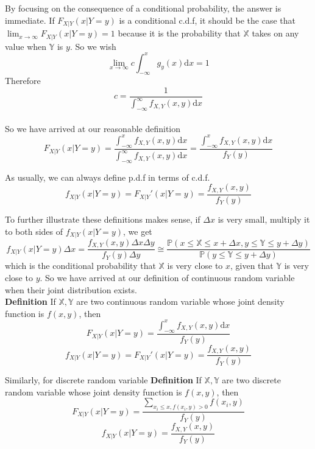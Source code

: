 \documentclass[a4paper,12pt]{article}
\begin{document}
By focusing on the consequence of a conditional probability, the answer is immediate. If $F_{X|Y}(x|Y=y)$ is a conditional c.d.f, it should be the case that $\lim_{x\to\infty}F_{X|Y}(x|Y=y) = 1$ because it is the probability that $\mathbb{X}$ takes on any value when $\mathbb{Y}$ is $y$. So we wish
$$\lim_{x\to\infty} c\int_{-\infty}^x g_y(x) \mathrm{d}x = 1$$
Therefore
$$c = \frac{1}{\int_{-\infty}^\infty f_{X,Y}(x, y)\mathrm{d}x}$$\\
So we have arrived at our reasonable definition
$$F_{X|Y}(x|Y=y) = \frac{\int_{-\infty}^x f_{X,Y}(x, y) \mathrm{d}x}{\int_{-\infty}^\infty f_{X,Y}(x, y)\mathrm{d}x} = \frac{\int_{-\infty}^x f_{X,Y}(x, y) \mathrm{d}x}{f_Y(y)}$$

As usually, we can always define p.d.f in terms of c.d.f. 
$$f_{X|Y}(x|Y=y) = F_{X|Y}'(x|Y=y) = \frac{f_{X,Y}(x, y)}{f_Y(y)}$$

To further illustrate these definitions makes sense, if $\Delta x$ is very small, multiply it to both sides of $f_{X|Y}(x|Y=y)$, we get
$$f_{X|Y}(x|Y=y)\Delta x = \frac{f_{X,Y}(x, y)\Delta x\Delta y}{f_Y(y)\Delta y} \cong \frac{\mathbb{P}(x \leq \mathbb{X} \leq x + \Delta x, y \leq \mathbb{Y} \leq y + \Delta y)}{\mathbb{P}( y \leq \mathbb{Y} \leq y + \Delta y )}$$ 
which is the conditional probability that $\mathbb{X}$ is very close to $x$, given that $\mathbb{Y}$ is very close to $y$. So we have arrived at our definition of continuous random variable when their joint distribution exists.\\

\textbf{Definition} If $\mathbb{X}, \mathbb{Y}$ are two continuous random variable whose joint density function is $f(x,y)$, then
$$F_{X|Y}(x|Y=y) = \frac{\int_{-\infty}^x f_{X,Y}(x, y) \mathrm{d}x}{f_Y(y)}$$
$$f_{X|Y}(x|Y=y) = F_{X|Y}'(x|Y=y) = \frac{f_{X,Y}(x, y)}{f_Y(y)}$$

Similarly, for discrete random variable
\textbf{Definition} If $\mathbb{X}, \mathbb{Y}$ are two discrete random variable whose joint density function is $f(x,y)$, then
$$F_{X|Y}(x|Y=y) = \frac{\sum_{x_i \leq x, f(x_i, y)>0} f(x_i, y)}{f_Y(y)}$$
$$f_{X|Y}(x|Y=y) = \frac{f_{X,Y}(x, y)}{f_Y(y)}$$
\end{document}
